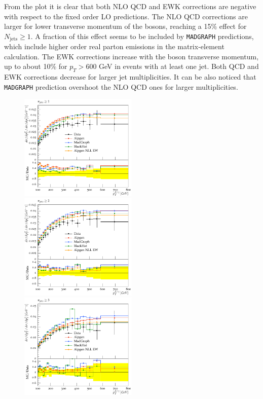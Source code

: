 \documentclass[11pt]{cernrep} \usepackage{graphicx,epsfig} 
\begin{document}
From the plot it is clear that both NLO QCD and EWK corrections are negative with respect to the fixed order LO
predictions. The NLO QCD corrections are larger for lower transverse momentum of the bosons, reaching a 15\% effect for
$N_{\mathrm{jets}} \geq 1$. A fraction of this effect seems to be included by {\tt MADGRAPH} predictions, which include higher order
real parton emissions in the matrix-element calculation. The EWK corrections increase with the boson transverse
momentum, up to about 10\% for $p_T > 600$ GeV in events with at least one jet. Both QCD and EWK corrections decrease
for larger jet multiplicities. It can be also noticed that {\tt MADGRAPH} prediction overshoot the NLO QCD ones for
larger multiplicities. 

\begin{figure}
\begin{center}
\includegraphics[width=0.5\textwidth]{d07-x01-y01.pdf} \\
\includegraphics[width=0.5\textwidth]{d08-x01-y01.pdf} \\
\includegraphics[width=0.5\textwidth]{d08-x02-y01.pdf}

\end{center}
\end{figure}
\end{document}
